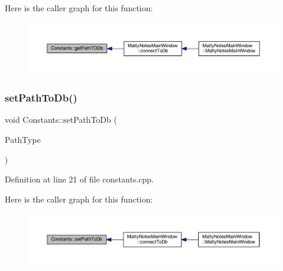 Here is the caller graph for this function\+:
\nopagebreak
\begin{figure}[H]
\begin{center}
\leavevmode
\includegraphics[width=350pt]{classConstants_ac74d671466a62e47fa4e431dbc569ba1_icgraph}
\end{center}
\end{figure}
\hypertarget{classConstants_a3d474cb2c4e964cb64ab6f2db6e1bf92}{}\label{classConstants_a3d474cb2c4e964cb64ab6f2db6e1bf92} 
\subsubsection{\texorpdfstring{set\+Path\+To\+Db()}{setPathToDb()}\hspace{0.1cm}{\footnotesize\ttfamily [1/2]}}
{\footnotesize\ttfamily void Constants\+::set\+Path\+To\+Db (\begin{DoxyParamCaption}\item[{\hyperlink{constants_8h_a9558e0854b1cdaf803f7a80df80ab91b}{Matty\+Path\+To\+Db\+Type}}]{Path\+Type }\end{DoxyParamCaption})\hspace{0.3cm}{\ttfamily [static]}}



Definition at line 21 of file constants.\+cpp.

Here is the caller graph for this function\+:
\nopagebreak
\begin{figure}[H]
\begin{center}
\leavevmode
\includegraphics[width=350pt]{classConstants_a3d474cb2c4e964cb64ab6f2db6e1bf92_icgraph}
\end{center}
\end{figure}
\hypertarget{classConstants_ac46a51b8ad96c36ebca1ffef26b11f84}{}\label{classConstants_ac46a51b8ad96c36ebca1ffef26b11f84} 
